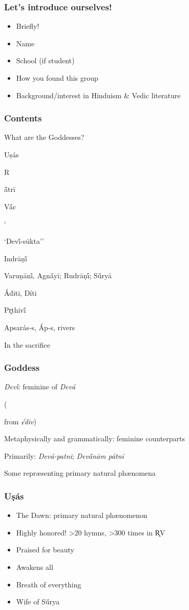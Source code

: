 \documentclass[pdf]{beamer}
\newcommand{\Subitem}[1]{{\setlength\itemindent{12pt} \item[-] #1}}
\begin{document}
\begin{frame} \frametitle{Let's introduce ourselves!}
\begin{itemize}
	\item Briefly!
	\item Name
	\item School (if student)
	\item How you found this group
	\item Background/interest in Hinduism \& Vedic literature
\end{itemize}
\end{frame}

\begin{frame} \frametitle{Contents}
\begin{itemize}
	\item What are the Goddesses?
	\item Uṣás
	\Subitem Rā́trī
	\item Vā́c
	\Subitem ``Devī́-sūkta''
	\item Indrāṇī́
	\item Varuṇānī́, Agnā́yī; Rudrāṇī́; Sū́ryā
	\item Áditi, Díti
	\item Pr̥thivī́
	\item Apsarás-s, Áp-s, rivers
	\item In the sacrifice
\end{itemize}
\end{frame}

\begin{frame} \frametitle{Goddess}
\begin{itemize}
	\item \textit{Devī́}: feminine of \textit{Devá}
	\Subitem (from \textit{√div})
	\item Metaphysically and grammatically: feminine counterparts
	\item Primarily: \textit{Devá-patnī}; \textit{Devā́nām pátnī}
	\item Some repræsenting primary natural phænomena
\end{itemize}
\end{frame}

\begin{frame} \frametitle{Uṣás}
\begin{itemize}
	\item The Dawn: primary natural phænomenon
	\item Highly honored! >20 hymns, >300 times in R̥V
	\item Praised for beauty
	\item Awakens all
	\item Breath of everything
	\item Wife of Sū́rya
\end{itemize}
\end{frame}
\end{document}
